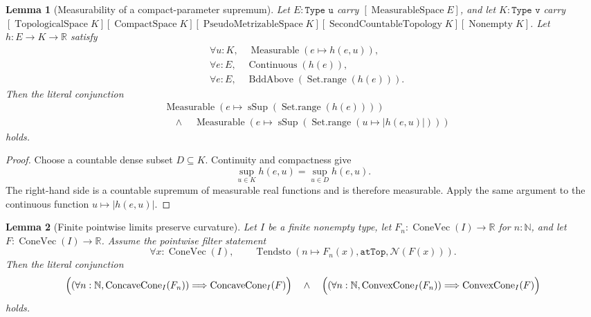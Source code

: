 \documentclass[9pt]{extarticle}
\newtheorem{lemma}{Lemma}[section]
\theoremstyle{definition}
\theoremstyle{remark}
\newcommand{\R}{\mathbb R}
\newcommand{\N}{\mathbb N}
\newcommand{\abs}[1]{\left\lvert #1\right\rvert}
\begin{document}
\begin{lemma}[Measurability of a compact-parameter supremum]
\label{lem:fnd-compact-sup-measurable}
Let $E:\texttt{Type u}$ carry $[\operatorname{MeasurableSpace}E]$,
and let $K:\texttt{Type v}$ carry
$[\operatorname{TopologicalSpace}K][\operatorname{CompactSpace}K]
[\operatorname{PseudoMetrizableSpace}K]
[\operatorname{SecondCountableTopology}K][\operatorname{Nonempty}K]$.
Let $h:E\to K\to\R$ satisfy
\begin{align*}
 &\forall u:K,\quad\operatorname{Measurable}(e\mapsto h(e,u)),\\
 &\forall e:E,\quad\operatorname{Continuous}(h(e)),\\
 &\forall e:E,\quad
   \operatorname{BddAbove}(\operatorname{Set.range}(h(e))).
\end{align*}
Then the literal conjunction
\begin{align*}
 &\operatorname{Measurable}\!\left(
  e\mapsto\operatorname{sSup}(\operatorname{Set.range}(h(e)))\right)\\
 &\quad\wedge\quad
 \operatorname{Measurable}\!\left(
  e\mapsto\operatorname{sSup}
   (\operatorname{Set.range}(u\mapsto\abs{h(e,u)}))\right)
\end{align*}
holds.
\end{lemma}

\begin{proof}
Choose a countable dense subset $D\subseteq K$.  Continuity and compactness
give
\[
 \sup_{u\in K}h(e,u)=\sup_{u\in D}h(e,u).
\]
The right-hand side is a countable supremum of measurable real functions and
is therefore measurable.  Apply the same argument to the continuous function
$u\mapsto\abs{h(e,u)}$.
\end{proof}

\begin{lemma}[Finite pointwise limits preserve curvature]
\label{lem:fnd-pointwise-curvature-limit}
Let $I$ be a finite nonempty type, let
$F_n:\operatorname{ConeVec}(I)\to\R$ for $n:\N$, and let
$F:\operatorname{ConeVec}(I)\to\R$.  Assume the pointwise filter
statement
\[
 \forall x:\operatorname{ConeVec}(I),\qquad
 \operatorname{Tendsto}(n\mapsto F_n(x),\texttt{atTop},
                         \mathcal N(F(x))).
\]
Then the literal conjunction
\[
 \Bigl((\forall n:\N,\operatorname{ConcaveCone}_I(F_n))
       \Longrightarrow\operatorname{ConcaveCone}_I(F)\Bigr)
 \quad\wedge\quad
 \Bigl((\forall n:\N,\operatorname{ConvexCone}_I(F_n))
       \Longrightarrow\operatorname{ConvexCone}_I(F)\Bigr)
\]
holds.
\end{lemma}
\end{document}
